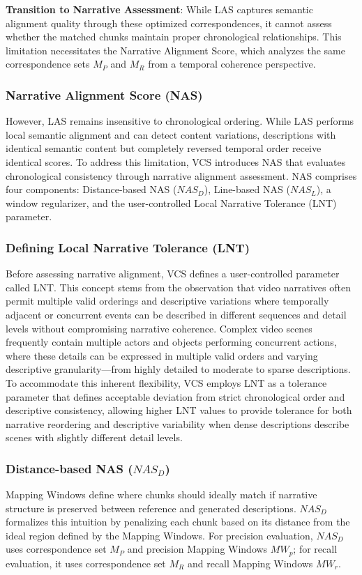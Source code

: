 \documentclass[main.tex]{subfiles}
\begin{document}
\textbf{Transition to Narrative Assessment}: While LAS captures semantic alignment quality through these optimized correspondences, it cannot assess whether the matched chunks maintain proper chronological relationships. This limitation necessitates the Narrative Alignment Score, which analyzes the same correspondence sets $M_P$ and $M_R$ from a temporal coherence perspective.

\subsubsection{Narrative Alignment Score (NAS)}
However, LAS remains insensitive to chronological ordering. While LAS performs local semantic alignment and can detect content variations, descriptions with identical semantic content but completely reversed temporal order receive identical scores. To address this limitation, VCS introduces NAS that evaluates chronological consistency through narrative alignment assessment. NAS comprises four components: Distance-based NAS ($NAS_D$), Line-based NAS ($NAS_L$), a window regularizer, and the user-controlled Local Narrative Tolerance (LNT) parameter.

\subsubsection{Defining Local Narrative Tolerance (LNT)}
Before assessing narrative alignment, VCS defines a user-controlled parameter called LNT. This concept stems from the observation that video narratives often permit multiple valid orderings and descriptive variations where temporally adjacent or concurrent events can be described in different sequences and detail levels without compromising narrative coherence. Complex video scenes frequently contain multiple actors and objects performing concurrent actions, where these details can be expressed in multiple valid orders and varying descriptive granularity—from highly detailed to moderate to sparse descriptions. To accommodate this inherent flexibility, VCS employs LNT as a tolerance parameter that defines acceptable deviation from strict chronological order and descriptive consistency, allowing higher LNT values to provide tolerance for both narrative reordering and descriptive variability when dense descriptions describe scenes with slightly different detail levels.

\subsubsection{Distance-based NAS ($NAS_D$)}
Mapping Windows define where chunks should ideally match if narrative structure is preserved between reference and generated descriptions. $NAS_D$ formalizes this intuition by penalizing each chunk based on its distance from the ideal region defined by the Mapping Windows. For precision evaluation, $NAS_D$ uses correspondence set $M_P$ and precision Mapping Windows $MW_p$; for recall evaluation, it uses correspondence set $M_R$ and recall Mapping Windows $MW_r$.
\end{document}

